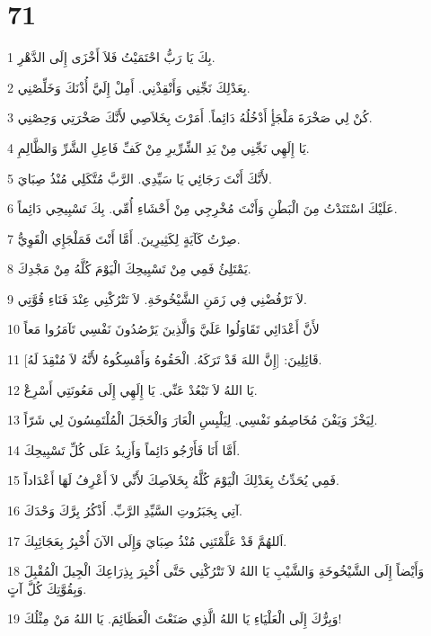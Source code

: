 \chapter{71}

\par 1 بِكَ يَا رَبُّ احْتَمَيْتُ فَلاَ أَخْزَى إِلَى الدَّهْرِ.
\par 2 بِعَدْلِكَ نَجِّنِي وَأَنْقِذْنِي. أَمِلْ إِلَيَّ أُذْنَكَ وَخَلِّصْنِي.
\par 3 كُنْ لِي صَخْرَةَ مَلْجَأٍ أَدْخُلُهُ دَائِماً. أَمَرْتَ بِخَلاَصِي لأَنَّكَ صَخْرَتِي وَحِصْنِي.
\par 4 يَا إِلَهِي نَجِّنِي مِنْ يَدِ الشِّرِّيرِ مِنْ كَفِّ فَاعِلِ الشَّرِّ وَالظَّالِمِ.
\par 5 لأَنَّكَ أَنْتَ رَجَائِي يَا سَيِّدِي. الرَّبَّ مُتَّكَلِي مُنْذُ صِبَايَ.
\par 6 عَلَيْكَ اسْتَنَدْتُ مِنَ الْبَطْنِ وَأَنْتَ مُخْرِجِي مِنْ أَحْشَاءِ أُمِّي. بِكَ تَسْبِيحِي دَائِماً.
\par 7 صِرْتُ كَآيَةٍ لِكَثِيرِينَ. أَمَّا أَنْتَ فَمَلْجَإِي الْقَوِيُّ.
\par 8 يَمْتَلِئُ فَمِي مِنْ تَسْبِيحِكَ الْيَوْمَ كُلَّهُ مِنْ مَجْدِكَ.
\par 9 لاَ تَرْفُضْنِي فِي زَمَنِ الشَّيْخُوخَةِ. لاَ تَتْرُكْنِي عِنْدَ فَنَاءِ قُوَّتِي.
\par 10 لأَنَّ أَعْدَائِي تَقَاوَلُوا عَلَيَّ وَالَّذِينَ يَرْصُدُونَ نَفْسِي تَآمَرُوا مَعاً
\par 11 قَائِلِينَ: [إِنَّ اللهَ قَدْ تَرَكَهُ. الْحَقُوهُ وَأَمْسِكُوهُ لأَنَّهُ لاَ مُنْقِذَ لَهُ].
\par 12 يَا اللهُ لاَ تَبْعُدْ عَنِّي. يَا إِلَهِي إِلَى مَعُونَتِي أَسْرِعْ.
\par 13 لِيَخْزَ وَيَفْنَ مُخَاصِمُو نَفْسِي. لِيَلْبِسِ الْعَارَ وَالْخَجَلَ الْمُلْتَمِسُونَ لِي شَرّاً.
\par 14 أَمَّا أَنَا فَأَرْجُو دَائِماً وَأَزِيدُ عَلَى كُلِّ تَسْبِيحِكَ.
\par 15 فَمِي يُحَدِّثُ بِعَدْلِكَ الْيَوْمَ كُلَّهُ بِخَلاَصِكَ لأَنِّي لاَ أَعْرِفُ لَهَا أَعْدَاداً.
\par 16 آتِي بِجَبَرُوتِ السَّيِّدِ الرَّبِّ. أَذْكُرُ بِرَّكَ وَحْدَكَ.
\par 17 اَللهُمَّ قَدْ عَلَّمْتَنِي مُنْذُ صِبَايَ وَإِلَى الآنَ أُخْبِرُ بِعَجَائِبِكَ.
\par 18 وَأَيْضاً إِلَى الشَّيْخُوخَةِ وَالشَّيْبِ يَا اللهُ لاَ تَتْرُكْنِي حَتَّى أُخْبِرَ بِذِرَاعِكَ الْجِيلَ الْمُقْبِلَ وَبِقُوَّتِكَ كُلَّ آتٍ.
\par 19 وَبِرُّكَ إِلَى الْعَلْيَاءِ يَا اللهُ الَّذِي صَنَعْتَ الْعَظَائِمَ. يَا اللهُ مَنْ مِثْلُكَ!
